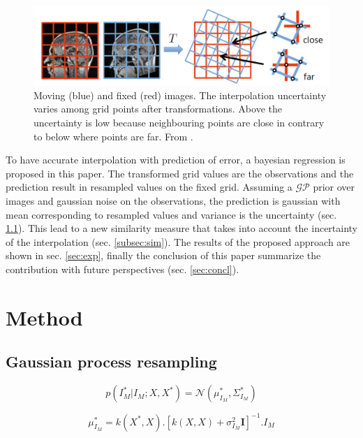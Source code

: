 \documentclass[10pt,twocolumn,letterpaper]{article}
\begin{document}
\begin{figure}
\begin{center}
   \includegraphics[width=1\linewidth]{Figures/uncertainty_ex}
\end{center}
   \caption{Moving (blue) and fixed (red) images. The interpolation uncertainty varies among grid points after transformations. Above the uncertainty is low because neighbouring points are close in contrary to below where points are far. From \cite{wachinger2014gaussian}.}
\label{fig:uncertainty_ex}
\end{figure}

To have accurate interpolation with prediction of error, a bayesian regression is proposed in this paper. The transformed grid values are the observations and the prediction result in resampled values on the fixed grid. Assuming a $\mathcal{GP}$ prior over images and gaussian noise on the observations, the prediction is gaussian with mean corresponding to resampled values and variance is the uncertainty (sec. \ref{subsec:gpresampling}). This lead to a new similarity measure that takes into account the incertainty of the interpolation (sec. \ref{subsec:sim}). The results of the proposed approach are shown in sec. \ref{sec:exp}, finally the conclusion of this paper summarize the contribution with future perspectives (sec. \ref{sec:concl}).

\section{Method}
\subsection{Gaussian process resampling}\label{subsec:gpresampling}

\begin{equation}
p(I_M^*|I_M;X,X^*)=\mathcal{N}(\mu_{I_M}^*,\Sigma_{I_M}^*)
\end{equation}\label{eq:reg}

\begin{equation}
\mu_{I_M}^*=k(X^*,X).[k(X,X)+\sigma_{I_M}^2\mathbf{I}]^{-1}.I_M
\end{equation}\label{eq:mu}
\end{document}

